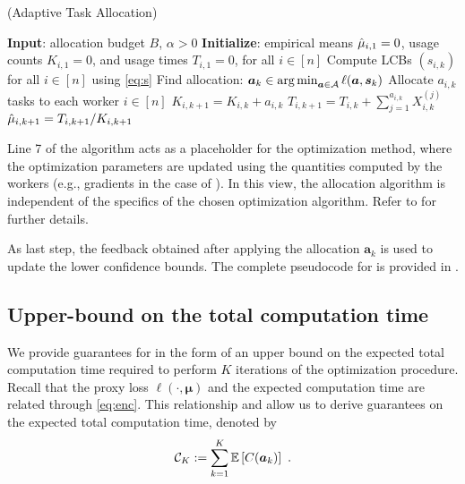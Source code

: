 \begin{algorithm}[t]
	\caption{ ({\red A}daptive {\red T}ask {\red A}llocation)}
    \label{alg:ata}
	\begin{algorithmic}[1]
        \STATE \textbf{Input}: allocation budget $B$, $\alpha>0$
        \STATE \textbf{Initialize}: empirical means $\hat{\mu}_{i,1} = 0$, usage counts $K_{i,1} = 0$, and usage times $T_{i,1} = 0$, for all $i \in [n]$
        \STATE Compute LCBs $(s_{i,k})$ for all $i \in [n]$ using \eqref{eq:s}
        \STATE Find allocation:
        $
        \bm{a}_k \in  \operatorname*{arg\,min}_{\bm{a} \in \mathcal{A}} \ell(\bm{a}, \bm{s}_k)
        $
		\STATE Allocate $a_{i,k}$ tasks to each worker $i \in [n]$
        \STATE $K_{i,k+1} = K_{i,k} + a_{i,k}$
        \STATE $T_{i,k+1} = T_{i,k} + \sum_{j=1}^{a_{i,k}} X_{i,k}^{(j)}$
        \STATE $\hat{\mu}_{i,k+1} = T_{i,k+1} / K_{i,k+1}$
        \ENDFOR
		\ENDFOR
	\end{algorithmic}
\end{algorithm}
\begin{remark}
	Line 7 of the algorithm acts as a placeholder for the optimization method, where the optimization parameters are updated using the quantities computed by the workers (e.g., gradients in the case of ). In this view, the allocation algorithm is independent of the specifics of the chosen optimization algorithm. Refer to  for further details.
\end{remark}


As last step, the feedback obtained after applying the allocation $\bm{a}_k$ is used to update the lower confidence bounds. The complete pseudocode for  is provided in .


\subsection{Upper-bound on the total computation time}
We provide guarantees for  in the form of an upper bound on the expected total computation time required to perform $K$ iterations of the optimization procedure. Recall that the proxy loss $\ell(\cdot, \bm{\mu})$ and the expected computation time are related through \eqref{eq:enc}. This relationship and  allow us to derive guarantees on the expected total computation time, denoted by
$$
	\mathcal{C}_K := \sum_{k=1}^{K} \mathbb{E}\left[C(\bm{a}_k)\right]~.
$$

